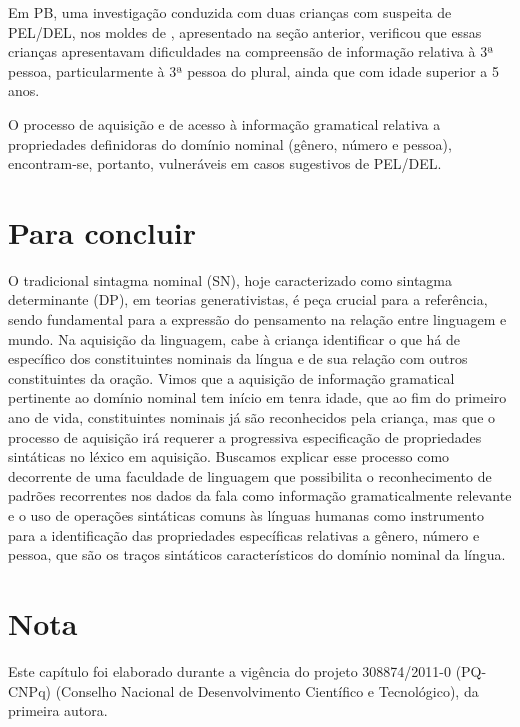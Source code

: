 \documentclass[output=paper]{LSP/langsci}
\begin{document}
Em PB, uma investigação conduzida com duas crianças com suspeita de PEL/DEL, nos moldes de \citet{correamartins2008}, apresentado na seção anterior, verificou que essas crianças apresentavam dificuldades na compreensão de informação relativa à 3ª pessoa, particularmente à 3ª pessoa do plural, ainda que com idade superior a 5 anos.

O processo de aquisição e de acesso à informação gramatical relativa a propriedades definidoras do domínio nominal (gênero, número e pessoa), encontram-se, portanto, vulneráveis em casos sugestivos de PEL/DEL. 

\section{Para concluir}
\label{sec:correanp_conclusao}

O tradicional sintagma nominal (SN), hoje caracterizado como sintagma determinante (DP), em teorias generativistas, é peça crucial para a referência, sendo fundamental para a expressão do pensamento na relação entre linguagem e mundo. Na aquisição da linguagem, cabe à criança identificar o que há de específico dos constituintes nominais da língua e de sua relação com outros constituintes da oração. Vimos que a aquisição de informação gramatical pertinente ao domínio nominal tem início em tenra idade, que ao fim do primeiro ano de vida, constituintes nominais já são reconhecidos pela criança, mas que o processo de aquisição irá requerer a progressiva especificação de propriedades sintáticas no léxico em aquisição. Buscamos explicar esse processo como decorrente de uma faculdade de linguagem que possibilita o reconhecimento de padrões recorrentes nos dados da fala como informação gramaticalmente relevante e o uso de operações sintáticas comuns às línguas humanas como instrumento para a identificação das propriedades específicas relativas a gênero, número e pessoa, que são os traços sintáticos característicos do domínio nominal da língua. 

\section*{Nota}

Este capítulo foi elaborado durante a vigência do projeto 308874/2011-0 (PQ-CNPq)  (Conselho Nacional de Desenvolvimento Científico e Tecnológico), da primeira autora.





{\sloppy
\printbibliography[heading=subbibliography,notkeyword=this]
}
\end{document}
